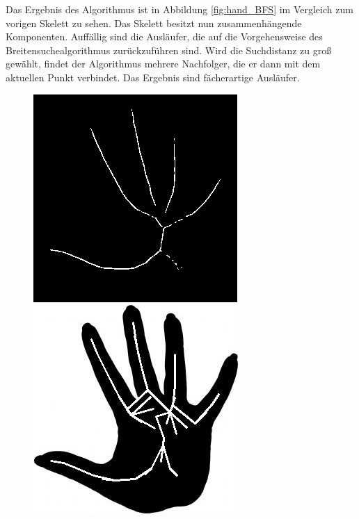 Das Ergebnis des Algorithmus ist in Abbildung \ref{fig:hand_BFS} im Vergleich zum vorigen Skelett zu sehen.
Das Skelett besitzt nun zusammenhängende Komponenten. Auffällig sind die Ausläufer, die auf die 
Vorgehensweise des Breitensuchealgorithmus zurückzuführen sind. Wird die Suchdistanz zu groß gewählt,
findet der Algorithmus mehrere Nachfolger, die er dann mit dem aktuellen Punkt verbindet. Das Ergebnis
sind fächerartige Ausläufer.
\begin{figure}[htbp]
	\centering
	\begin{minipage}{5cm}
		\centering
		\includegraphics[width=1.0\linewidth]{./fig/hand-skelett}
	\end{minipage}
	\hspace{2cm}
	\begin{minipage}{5cm}
		\centering
		\includegraphics[width=1.0\linewidth]{./fig/hand-bfs}

\end{minipage}
\end{figure}
